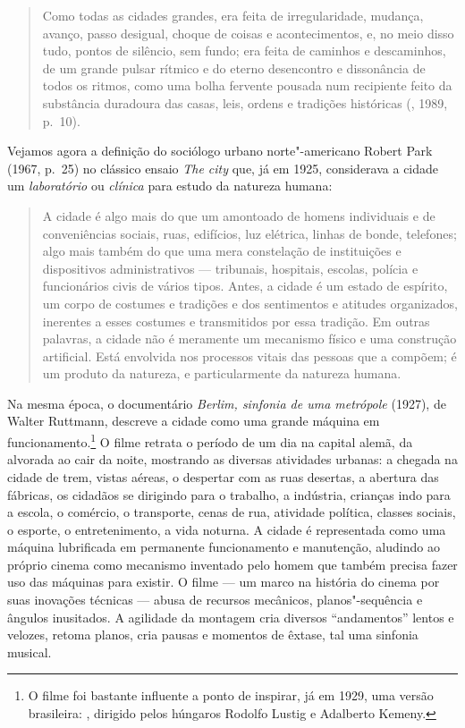 \begin{quote}
Como todas as cidades grandes, era feita de irregularidade, mudança,
avanço, passo desigual, choque de coisas e acontecimentos, e, no meio
disso tudo, pontos de silêncio, sem fundo; era feita de caminhos e
descaminhos, de um grande pulsar rítmico e do eterno desencontro e
dissonância de todos os ritmos, como uma bolha fervente pousada num
recipiente feito da substância duradoura das casas, leis, ordens e
tradições históricas (, 1989, p.~10).
\end{quote}

Vejamos agora a definição do sociólogo urbano norte"-americano Robert
Park (1967, p.~25) no clássico ensaio \emph{The city} que, já em 1925,
considerava a cidade um \emph{laboratório} ou \emph{clínica} para estudo
da natureza humana:

\begin{quote}
A cidade é algo mais do que um amontoado de homens individuais e de
conveniências sociais, ruas, edifícios, luz elétrica, linhas de bonde,
telefones; algo mais também do que uma mera constelação de
instituições e dispositivos administrativos --- tribunais, hospitais,
escolas, polícia e funcionários civis de vários tipos. Antes, a cidade é
um estado de espírito, um corpo de costumes e tradições e dos
sentimentos e atitudes organizados, inerentes a esses costumes e
transmitidos por essa tradição. Em outras palavras, a cidade não é
meramente um mecanismo físico e uma construção artificial. Está
envolvida nos processos vitais das pessoas que a compõem; é um produto
da natureza, e particularmente da natureza humana.
\end{quote}

Na mesma época, o documentário \emph{Berlim, sinfonia de uma
metrópole} (1927), de Walter Ruttmann, descreve a cidade como uma grande
máquina em funcionamento.\footnote{O filme foi bastante influente a
  ponto de inspirar, já em 1929, uma versão brasileira: {}, dirigido pelos húngaros Rodolfo Lustig e
  Adalberto Kemeny.} O filme retrata o período de um dia na capital
alemã, da alvorada ao cair da noite, mostrando as diversas atividades urbanas: a chegada na cidade de trem, vistas aéreas, o despertar com as
ruas desertas, a abertura das fábricas, os cidadãos se dirigindo para o
trabalho, a indústria, crianças indo para a escola, o comércio, o
transporte, cenas de rua, atividade política, classes sociais, o
esporte, o entretenimento, a vida noturna. A cidade é representada como
uma máquina lubrificada em permanente funcionamento e manutenção,
aludindo ao próprio cinema como mecanismo inventado pelo homem que
também precisa fazer uso das máquinas para existir. O filme --- um marco
na história do cinema por suas inovações técnicas --- abusa de recursos
mecânicos, planos"-sequência e ângulos inusitados. A agilidade da
montagem cria diversos ``andamentos'' lentos e velozes, retoma planos,
cria pausas e momentos de êxtase, tal uma sinfonia musical.

